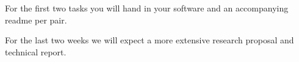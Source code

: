 \documentclass[10pt]{scrartcl}
\begin{document}
For the first two tasks you will hand in your software and an accompanying readme per
pair. 

For the last two weeks we will expect a more extensive research proposal and technical report.

\begin{comment}
\subsection{Writing reports}
The reports you hand in should be about 2 to 3 pages, written in English or Dutch 
and contain (at least) the following topics: 
\begin{itemize}
  \item explain the problem at hand
  \item discuss possible solutions you considered
  \item why did you choose the solution you implemented?
  \item how did you test your program?
  \item conclude with any suggestions for improving your algorithm or code
\end{itemize}

Although the lab report in not quite like a small research paper, it is still supposed to
be an academic report of your work, rather than an informal description of how you spend your week.\\

\noindent So do:
\begin{itemize}
\item Clearly structure your report
\item Explain your method formally
\item Report your experiments and results precisely
\item Write in correct academic English or Dutch
\end{itemize}
Don't:
\begin{itemize}
\item Give a day to day overview of your activities
\item Talk about debugging or how much time you spend implementing a particular feature
\item Mention if a TA or fellow student suggested something to you. Just explain what you did and why (which should be a better reason than just someone telling you to)
\end{itemize}
\end{comment}
\end{document}
